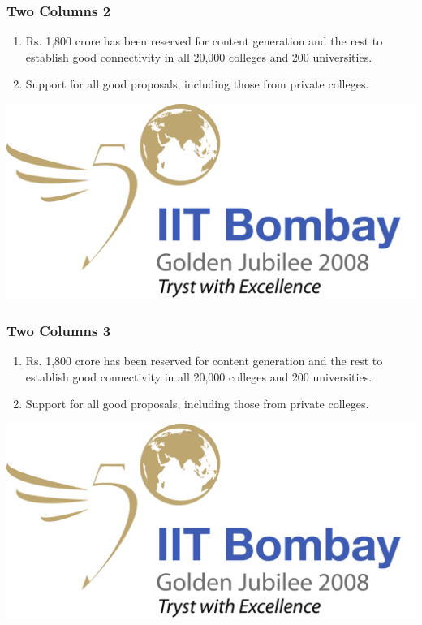 \documentclass{beamer}
\begin{document}
\begin{frame}
\frametitle{Two Columns 2}
\begin{minipage}[c]{0.45\textwidth}
\begin{enumerate}
\item<+-|alert@+> Rs. 1,800 crore has been reserved for
  content generation and the rest to establish good
  connectivity in all 20,000 colleges and 200
  universities.
\item<+-|alert@+> Support for all good proposals,
  including those from private colleges.
\end{enumerate}
\end{minipage} 
\hfill
\begin{minipage}[c]{0.45\textwidth}
\includegraphics[width=\linewidth]{iitb}
\end{minipage}
\end{frame}

\begin{frame}
\frametitle{Two Columns 3}
\begin{minipage}[c]{0.45\textwidth}
\begin{enumerate}
\item<+-|alert@+> Rs. 1,800 crore has been reserved for
  content generation and the rest to establish good
  connectivity in all 20,000 colleges and 200
  universities.
\item<+-|alert@+> Support for all good proposals,
  including those from private colleges.
\end{enumerate}
\end{minipage} \pause %
\hfill
\begin{minipage}[c]{0.45\textwidth}
\includegraphics[width=\linewidth]{iitb}
\end{minipage}
\end{frame}
\end{document}
